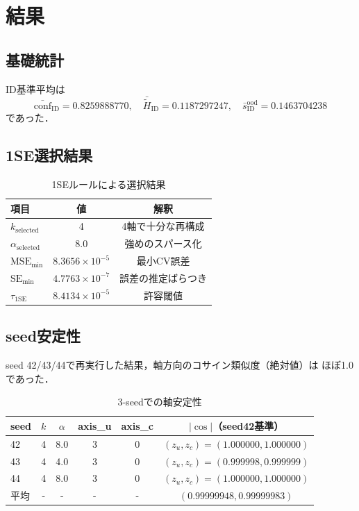 \documentclass[11pt,a4paper]{article}
\begin{document}
\section{結果}
\subsection*{基礎統計}
ID基準平均は
\begin{equation}
\bar{\mathrm{conf}}_{\mathrm{ID}}=0.8259888770,
\quad
\bar{\tilde{H}}_{\mathrm{ID}}=0.1187297247,
\quad
\bar{s}^{\mathrm{ood}}_{\mathrm{ID}}=0.1463704238
\end{equation}
であった．

\subsection*{1SE選択結果}
\begin{table}[H]
\centering
\begin{tabular}{lcc}
\toprule
項目 & 値 & 解釈 \\
\midrule
$k_{\mathrm{selected}}$ & 4 & 4軸で十分な再構成 \\
$\alpha_{\mathrm{selected}}$ & 8.0 & 強めのスパース化 \\
$\mathrm{MSE}_{\min}$ & $8.3656\times 10^{-5}$ & 最小CV誤差 \\
$\mathrm{SE}_{\min}$ & $4.7763\times 10^{-7}$ & 誤差の推定ばらつき \\
$\tau_{\mathrm{1SE}}$ & $8.4134\times 10^{-5}$ & 許容閾値 \\
\bottomrule
\end{tabular}
\caption{1SEルールによる選択結果}
\label{tab:one_se}
\end{table}

\subsection*{seed安定性}
seed 42/43/44で再実行した結果，軸方向のコサイン類似度（絶対値）は
ほぼ1.0であった．

\begin{table}[H]
\centering
\begin{tabular}{lccccc}
\toprule
seed & $k$ & $\alpha$ & axis\_u & axis\_c & $|\cos|$（seed42基準）\\
\midrule
42 & 4 & 8.0 & 3 & 0 & $(z_u,z_c)=(1.000000,1.000000)$ \\
43 & 4 & 4.0 & 3 & 0 & $(z_u,z_c)=(0.999998,0.999999)$ \\
44 & 4 & 8.0 & 3 & 0 & $(z_u,z_c)=(1.000000,1.000000)$ \\
\midrule
平均 & - & - & - & - & $(0.99999948,0.99999983)$ \\
\bottomrule
\end{tabular}
\caption{3-seedでの軸安定性}
\label{tab:stability}
\end{table}
\end{document}
